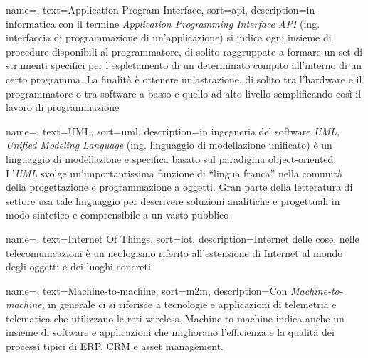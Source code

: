 
\renewcommand{\acronymname}{Acronimi e abbreviazioni}





\renewcommand{\glossaryname}{Glossario}

{
    name=,
    text=Application Program Interface,
    sort=api,
    description={in informatica con il termine \emph{Application Programming Interface API} (ing. interfaccia di programmazione di un'applicazione) si indica ogni insieme di procedure disponibili al programmatore, di solito raggruppate a formare un set di strumenti specifici per l'espletamento di un determinato compito all'interno di un certo programma. La finalità è ottenere un'astrazione, di solito tra l'hardware e il programmatore o tra software a basso e quello ad alto livello semplificando così il lavoro di programmazione}
}

{
    name=,
    text=UML,
    sort=uml,
    description={in ingegneria del software \emph{UML, Unified Modeling Language} (ing. linguaggio di modellazione unificato) è un linguaggio di modellazione e specifica basato sul paradigma object-oriented. L'\emph{UML} svolge un'importantissima funzione di ``lingua franca'' nella comunità della progettazione e programmazione a oggetti. Gran parte della letteratura di settore usa tale linguaggio per descrivere soluzioni analitiche e progettuali in modo sintetico e comprensibile a un vasto pubblico}
}

{
    name=,
    text=Internet Of Things,
    sort=iot,
    description={Internet delle cose, nelle telecomunicazioni è un neologismo riferito all'estensione di Internet al mondo degli oggetti 
                e dei luoghi concreti.}
}

{
    name=,
    text=Machine-to-machine,
    sort=m2m,
    description={Con \emph{Machine-to-machine}, in generale ci si riferisce a tecnologie e applicazioni di telemetria e telematica che utilizzano le 
                reti wireless. Machine-to-machine indica anche un insieme di software e applicazioni che migliorano l'efficienza e la qualità dei 
                processi tipici di ERP, CRM e asset management.}
}
